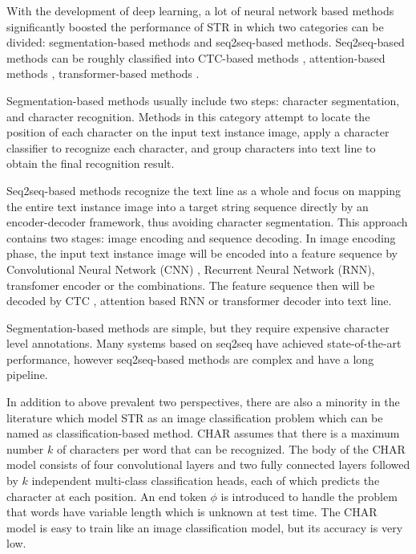 \documentclass[final]{cvpr}
\begin{document}
With the development of deep learning, a lot of neural network based methods significantly boosted the performance of STR in which two categories can be divided: segmentation-based methods \cite{liao2019scene} and seq2seq-based methods.
Seq2seq-based methods can be roughly classified into CTC-based \cite{graves2006connectionist} methods \cite{shi2016end, borisyuk2018rosetta, du2020pp}, attention-based \cite{bahdanau2014neural} methods \cite{shi2016robust, shi2018aster, li2019show, zhan2019esir}, transformer-based \cite{vaswani2017attention} methods \cite{sheng2019nrtr, yang2019simple, lu2019master, lee2020recognizing, bartz2019kiss, yu2020towards}.

Segmentation-based \cite{liao2019scene} methods usually include two steps: character segmentation,
and character recognition. Methods in this category attempt to locate the position of each character on the input text instance image, apply a character classifier to recognize each character, and group characters into text line to obtain the final recognition result.

Seq2seq-based methods recognize the text line as a whole and focus on mapping the entire text instance image into a target string sequence directly by an encoder-decoder framework, thus avoiding character segmentation. This approach contains two stages: image encoding and sequence decoding. In image encoding phase, the input text instance image will be encoded into a feature sequence by Convolutional Neural Network (CNN) \cite{lecun1998gradient}, Recurrent Neural Network (RNN), transfomer \cite{vaswani2017attention} encoder or the combinations. The feature sequence then will be decoded by CTC \cite{graves2006connectionist}, attention based RNN or transformer \cite{vaswani2017attention} decoder into text line.

Segmentation-based methods \cite{liao2019scene} are simple, but they require expensive character level annotations. Many systems based on seq2seq have achieved state-of-the-art performance, however seq2seq-based methods are complex and have a long pipeline.

In addition to above prevalent two perspectives, there are also a minority in the literature which model STR as an image classification problem which can be named as classification-based method. CHAR \cite{jaderberg14c} assumes that there is a maximum number $k$ of characters per word  that can be recognized.
The body of the CHAR model consists of four convolutional layers and two fully connected layers followed by $k$ independent multi-class classification heads, each of which predicts the character at each position. An end token $\phi$ is introduced  to handle the problem that words have variable length which is unknown at test time.
The CHAR model is easy to train like an image classification model, but its accuracy is very low.
\end{document}
